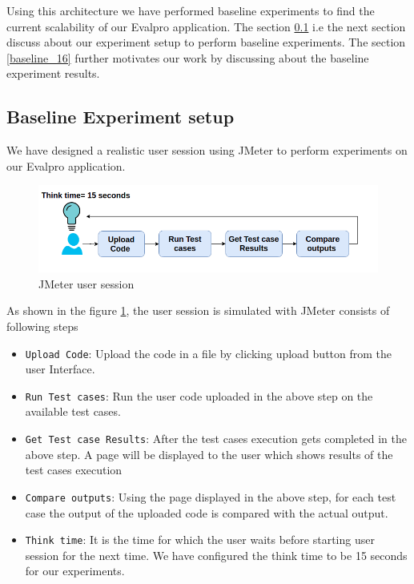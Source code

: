 \documentclass[sigconf]{acmart}
\begin{document}
Using this  architecture we have performed baseline experiments to find the current scalability of our Evalpro application. The section \ref{baseline_experiemnt_setup} i.e the next section discuss about our experiment setup to perform baseline experiments. The section \ref{baseline_16} further motivates our work by discussing about the baseline experiment results.

\subsection{Baseline Experiment setup}\label{baseline_experiemnt_setup}
We have designed a realistic user session using JMeter to perform experiments on our Evalpro application.
\begin{figure}[!htb]
  \centering
  \includegraphics[width=\linewidth]{Pictures/user_session.png}
  \caption{JMeter user session}
  \label{user_session}
\end{figure}
As shown in the figure \ref{user_session}, the user session is simulated with JMeter consists of following steps
\begin{itemize}
\item {\texttt{Upload Code}}: Upload the code in a file by clicking upload button from the user Interface.
 \item {\texttt{Run Test cases}}: Run the user code uploaded in the above step on the available test cases.
\item {\texttt{Get Test case Results}}: After the test cases execution gets completed in the above step. A page will be displayed to the user which shows results of the test cases execution
\item {\texttt{Compare outputs}}: Using the page displayed in the above step, for each test case the output of the uploaded code is compared with the actual output.
\item {\texttt{Think time}}: It is the time for which the user waits before starting  user session for the next time. We have configured the think time to be 15 seconds for our experiments.
\end{itemize}
\end{document}
